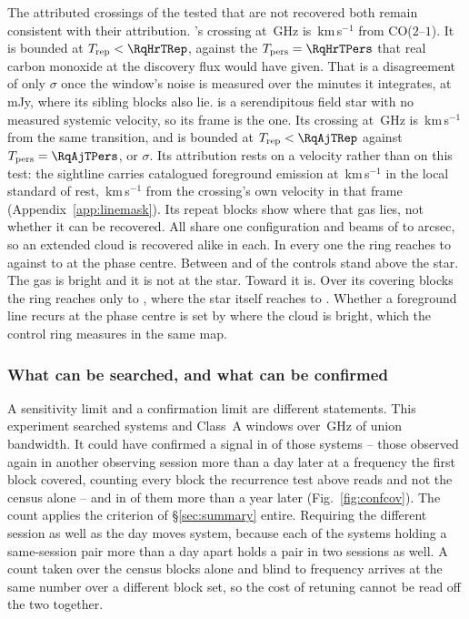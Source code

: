 The \MkAttrExcl{} attributed crossings of the \MkAttrTested{} tested that are
not recovered both remain consistent with their attribution. \RqHrStar's crossing at \RqHrFreq\,GHz is \RqHrDv\,km\,s$^{-1}$ from
CO($2$--$1$). It is bounded at $T_{\rm rep}<\RqHrTRep$, against the
$T_{\rm pers}=\RqHrTPers$ that real carbon monoxide at the discovery flux
would have given. That is a disagreement of only \RqHrExcl$\sigma$ once the
window's noise is measured over the \RqHrOnsMin{} minutes it integrates, at
\RqHrRms\,mJy, where its sibling blocks also lie. \RqAjStar{} is a serendipitous field star with no measured systemic
velocity, so its frame is the \RqAjFrame{} one. Its crossing at
\RqAjFreq\,GHz is \RqAjDv\,km\,s$^{-1}$ from the same transition, and is
bounded at $T_{\rm rep}<\RqAjTRep$ against $T_{\rm pers}=\RqAjTPers$, or
\RqAjExcl$\sigma$. Its attribution rests
on a velocity rather than on this test: the sightline carries catalogued
foreground emission at \LsLupVco\,km\,s$^{-1}$ in the local standard of rest,
\LsLupDv\,km\,s$^{-1}$ from the crossing's own velocity in that frame
(Appendix~\ref{app:linemask}). Its repeat blocks show where that gas lies, not
whether it can be recovered. All \RqAjNRep{} share one \RqAjArray{} configuration and beams of
\RqAjBeamLo{} to \RqAjBeamHi{} arcsec, so an extended cloud is recovered
alike in each. In every one the ring reaches \RqAjCtrlLo{} to \RqAjCtrlHi{} against
\RqAjStarLo{} to \RqAjStarHi{} at the phase centre. Between \RqAjNgeLo{} and
\RqAjNgeHi{} of the \NCtrl{} controls stand above the star.
The gas is bright and it is not at the star. Toward \RqRecurCloudStars{} it is. Over its \RqCtlNBlock{} covering blocks
the ring reaches only \RqCtlRingLo{} to \RqCtlRingHi, where the star itself
reaches \RqCtlStarLo{} to \RqCtlStarHi.
Whether a foreground line recurs at the phase centre is set by where the cloud
is bright, which the control ring measures in the same map.

\subsubsection{What can be searched, and what can be confirmed}
\label{sec:confirmability}

A sensitivity limit and a confirmation limit are different statements. This experiment searched \RcSearchSys{} systems and \RcSearchWin{}
Class~A windows over \CvUnionA\,GHz of union bandwidth. It could have
confirmed a signal in \ZcConfSysDay{} of those systems -- those observed
again in another observing session more than a day later at a frequency the
first block covered, counting every block the recurrence test above reads and
not the census alone -- and
in \ZcConfSysYr{} of them more than a year later
(Fig.~\ref{fig:confcov}). The count applies the criterion of
\S\ref{sec:summary} entire. Requiring the different session as well as the day
moves \QfNSysMovedWord{} system, because each of the \QfNSysPairDropWord{}
systems holding a same-session pair more than a day apart holds a pair in two
sessions as well. A count taken over the census blocks alone and blind to
frequency arrives at the same number over a different block set, so the cost
of retuning cannot be read off the two together.


